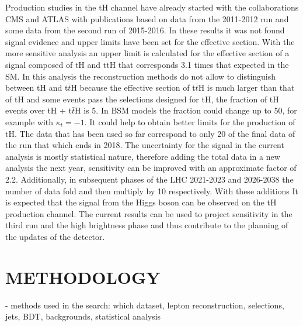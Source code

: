 \documentclass[final,3p]{CSP}
\begin{document}
Production studies in the tH channel have already started with the collaborations CMS and 
ATLAS with publications based on data from the 2011-2012 run and some data from the second 
run of 2015-2016. In these results it was not found signal evidence and upper limits have 
been set for the effective section. With the more sensitive analysis an upper limit is 
calculated for the effective section of a signal composed of tH and ttH that corresponds 3.1 
times that expected in the SM. In this analysis the reconstruction methods do not allow to 
distinguish between tH and t$\bar{t}$H because the effective section of t$\bar{t}$H is much 
larger than that of tH and some events pass the selections designed for tH, the fraction of 
tH events over tH + t$\bar{t}$H is 5. In BSM models the fraction could change up to 50, for 
example with $\kappa_t = -1$. It could help to obtain better limits for the production of tH. 
The data that has been used so far correspond to only 20 of the final data of the run that 
which ends in 2018. The uncertainty for the signal in the current analysis is mostly 
statistical nature, therefore adding the total data in a new analysis the next year, 
sensitivity can be improved with an approximate factor of 2.2. Additionally, in subsequent 
phases of the LHC 2021-2023 and 2026-2038 the number of data fold and then multiply by 10 
respectively. With these additions It is expected that the signal from the Higgs boson can be 
observed on the tH production channel. The current results can be used to project sensitivity 
in the third run and the high brightness phase and thus contribute to the planning of the 
updates of the detector.

\section{METHODOLOGY}
- methods used in the search: which dataset,  lepton reconstruction, selections, jets, BDT, backgrounds, statistical analysis\\
\end{document}
